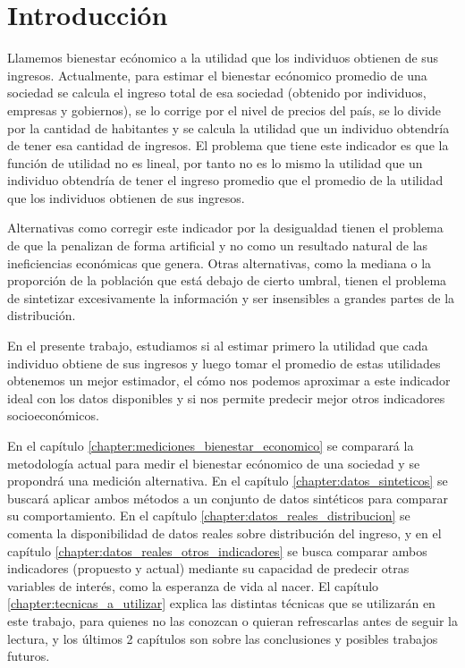 \chapter{Introducción}

Llamemos bienestar ecónomico a la utilidad que los individuos obtienen de sus ingresos. Actualmente, para estimar el bienestar ecónomico promedio de una sociedad se calcula el ingreso total de esa sociedad (obtenido por individuos, empresas y gobiernos), se lo corrige por el nivel de precios del país, se lo divide por la cantidad de habitantes y se calcula la utilidad que un individuo obtendría de tener esa cantidad de ingresos. El problema que tiene este indicador es que la función de utilidad no es lineal, por tanto no es lo mismo la utilidad que un individuo obtendría de tener el ingreso promedio que el promedio de la utilidad que los individuos obtienen de sus ingresos. 

Alternativas como corregir este indicador por la desigualdad tienen el problema de que la penalizan de forma artificial y no como un resultado natural de las ineficiencias económicas que genera. Otras alternativas, como la mediana o la proporción de la población que está debajo de cierto umbral, tienen el problema de sintetizar excesivamente la información y ser insensibles a grandes partes de la distribución.

En el presente trabajo, estudiamos si al estimar primero la utilidad que cada individuo obtiene de sus ingresos y luego tomar el promedio de estas utilidades obtenemos un mejor estimador, el cómo nos podemos aproximar a este indicador ideal con los datos disponibles y si nos permite predecir mejor otros indicadores socioeconómicos.

En el capítulo \ref{chapter:mediciones_bienestar_economico} se comparará la metodología actual para medir el bienestar ecónomico de una sociedad y se propondrá una medición alternativa. En el capítulo \ref{chapter:datos_sinteticos} se buscará aplicar ambos métodos a un conjunto de datos sintéticos para comparar su comportamiento. En el capítulo \ref{chapter:datos_reales_distribucion} se comenta la disponibilidad de datos reales sobre distribución del ingreso, y en el capítulo \ref{chapter:datos_reales_otros_indicadores} se busca comparar ambos indicadores (propuesto y actual) mediante su capacidad de predecir otras variables de interés, como la esperanza de vida al nacer. El capítulo \ref{chapter:tecnicas_a_utilizar} explica las distintas técnicas que se utilizarán en este trabajo, para quienes no las conozcan o quieran refrescarlas antes de seguir la lectura, y los últimos 2 capítulos son sobre las conclusiones y posibles trabajos futuros.

